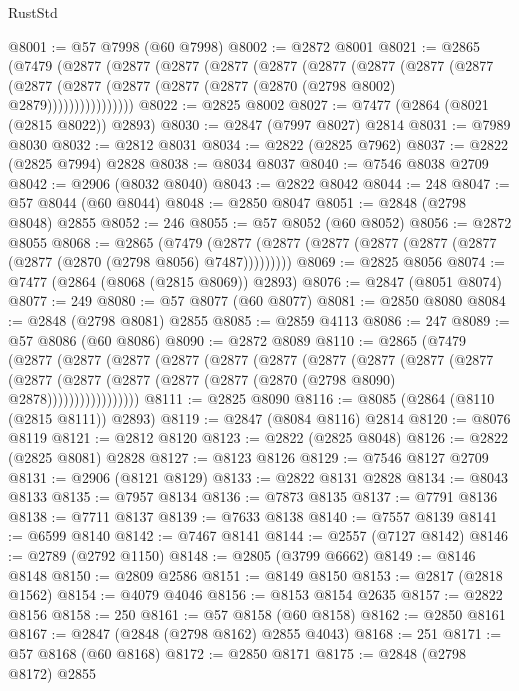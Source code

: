 \begin{lexlean}{RustStd}
\begin{coremodule}
@8001 := @57 @7998 (@60 @7998)
@8002 := @2872 @8001
@8021 := @2865
    (@7479
      (@2877
        (@2877
          (@2877
            (@2877
              (@2877
                (@2877
                  (@2877
                    (@2877
                      (@2877
                        (@2877
                          (@2877 (@2877 (@2877 (@2877 (@2870 (@2798 @8002) @2879))))))))))))))))
@8022 := @2825 @8002
@8027 := @7477 (@2864 (@8021 (@2815 @8022)) @2893)
@8030 := @2847 (@7997 @8027) @2814
@8031 := @7989 @8030
@8032 := @2812 @8031
@8034 := @2822 (@2825 @7962)
@8037 := @2822 (@2825 @7994) @2828
@8038 := @8034 @8037
@8040 := @7546 @8038 @2709
@8042 := @2906 (@8032 @8040)
@8043 := @2822 @8042
@8044 := 248
@8047 := @57 @8044 (@60 @8044)
@8048 := @2850 @8047
@8051 := @2848 (@2798 @8048) @2855
@8052 := 246
@8055 := @57 @8052 (@60 @8052)
@8056 := @2872 @8055
@8068 := @2865
    (@7479 (@2877 (@2877 (@2877 (@2877 (@2877 (@2877 (@2877 (@2870 (@2798 @8056) @7487)))))))))
@8069 := @2825 @8056
@8074 := @7477 (@2864 (@8068 (@2815 @8069)) @2893)
@8076 := @2847 (@8051 @8074)
@8077 := 249
@8080 := @57 @8077 (@60 @8077)
@8081 := @2850 @8080
@8084 := @2848 (@2798 @8081) @2855
@8085 := @2859 @4113
@8086 := 247
@8089 := @57 @8086 (@60 @8086)
@8090 := @2872 @8089
@8110 := @2865
    (@7479
      (@2877
        (@2877
          (@2877
            (@2877
              (@2877
                (@2877
                  (@2877
                    (@2877
                      (@2877
                        (@2877
                          (@2877
                            (@2877 (@2877 (@2877 (@2877 (@2870 (@2798 @8090) @2878)))))))))))))))))
@8111 := @2825 @8090
@8116 := @8085 (@2864 (@8110 (@2815 @8111)) @2893)
@8119 := @2847 (@8084 @8116) @2814
@8120 := @8076 @8119
@8121 := @2812 @8120
@8123 := @2822 (@2825 @8048)
@8126 := @2822 (@2825 @8081) @2828
@8127 := @8123 @8126
@8129 := @7546 @8127 @2709
@8131 := @2906 (@8121 @8129)
@8133 := @2822 @8131 @2828
@8134 := @8043 @8133
@8135 := @7957 @8134
@8136 := @7873 @8135
@8137 := @7791 @8136
@8138 := @7711 @8137
@8139 := @7633 @8138
@8140 := @7557 @8139
@8141 := @6599 @8140
@8142 := @7467 @8141
@8144 := @2557 (@7127 @8142)
@8146 := @2789 (@2792 @1150)
@8148 := @2805 (@3799 @6662)
@8149 := @8146 @8148
@8150 := @2809 @2586
@8151 := @8149 @8150
@8153 := @2817 (@2818 @1562)
@8154 := @4079 @4046
@8156 := @8153 @8154 @2635
@8157 := @2822 @8156
@8158 := 250
@8161 := @57 @8158 (@60 @8158)
@8162 := @2850 @8161
@8167 := @2847 (@2848 (@2798 @8162) @2855 @4043)
@8168 := 251
@8171 := @57 @8168 (@60 @8168)
@8172 := @2850 @8171
@8175 := @2848 (@2798 @8172) @2855

\end{coremodule}
\end{lexlean}

